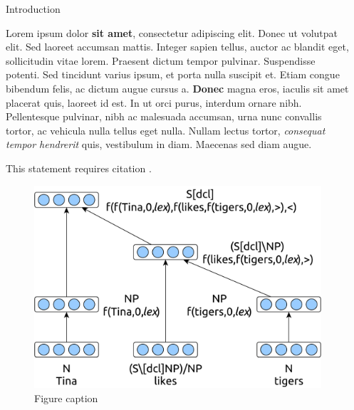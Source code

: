 \documentclass[final]{beamer}
\newlength{\sepwid}
\newlength{\onecolwid}
\begin{document}
\begin{frame}[t]
\begin{columns}[t]
\begin{column}{\onecolwid}
      \begin{block}{Introduction}

        Lorem ipsum dolor \textbf{sit amet}, consectetur adipiscing elit. Donec
        ut volutpat elit. Sed laoreet accumsan mattis. Integer sapien tellus,
        auctor ac blandit eget, sollicitudin vitae lorem. Praesent dictum tempor
        pulvinar. Suspendisse potenti. Sed tincidunt varius ipsum, et porta
        nulla suscipit et. Etiam congue bibendum felis, ac dictum augue cursus
        a. \textbf{Donec} magna eros, iaculis sit amet placerat quis, laoreet id
        est. In ut orci purus, interdum ornare nibh. Pellentesque pulvinar, nibh
        ac malesuada accumsan, urna nunc convallis tortor, ac vehicula nulla
        tellus eget nulla. Nullam lectus tortor, \textit{consequat tempor
          hendrerit} quis, vestibulum in diam. Maecenas sed diam augue.

        This statement requires citation \cite{Hermann:2013:ACL}.

      \end{block}


      \begin{figure}
        \includegraphics[width=0.8\linewidth]{fig1.pdf}
        \caption{Figure caption}
      \end{figure}


    \end{column} %

  \begin{column}{\sepwid}\end{column} %


\end{columns}
\end{frame}
\end{document}
